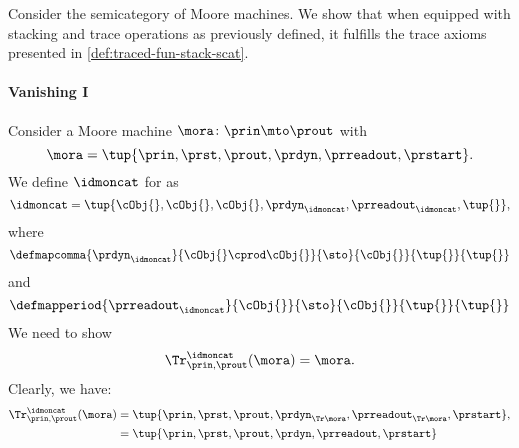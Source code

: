 
\begin{example}
    Consider the semicategory \Moore of Moore machines.
    We show that when equipped with stacking and trace operations as previously defined, it fulfills the trace axioms presented in \cref{def:traced-fun-stack-scat}.

    \paragraph*{Vanishing I}
    Consider a Moore machine $\mora\colon \prin \mto \prout$ with
    \begin{equation*}
        \mora=\tup{\prin,\prst, \prout, \prdyn,\prreadout,\prstart}.
    \end{equation*}
    We define $\idmoncat$ for \Moore as
    \begin{equation*}
        \idmoncat=\tup{\cObj{},\cObj{},\cObj{},\prdyn_\idmoncat, \prreadout_\idmoncat, \tup{}},
    \end{equation*}
    where
    \begin{equation*}
        \defmapcomma{\prdyn_{\idmoncat}}
        {\cObj{} \cprod \cObj{}}
        {\sto}
        {\cObj{}}
        {\tup{}}
        {\tup{}}
    \end{equation*}
    and
    \begin{equation*}
        \defmapperiod{\prreadout_{\idmoncat}}
        {\cObj{}}
        {\sto}
        {\cObj{}}
        {\tup{}}
        {\tup{}}
    \end{equation*}
    We need to show
    \begin{equation*}
        \Tr_{\prin,\prout}^{\idmoncat}(\mora)=\mora.
    \end{equation*}
    Clearly, we have:
    \begin{equation*}
        \begin{aligned}
            \Tr_{\prin,\prout}^{\idmoncat}(\mora) & =\tup{\prin, \prst, \prout, \prdyn_{\Tr \mora}, \prreadout_{\Tr \mora},\prstart}, \\
                                                  & =\tup{\prin, \prst, \prout, \prdyn, \prreadout,\prstart} \\

\end{aligned}
\end{equation*}
\end{example}
